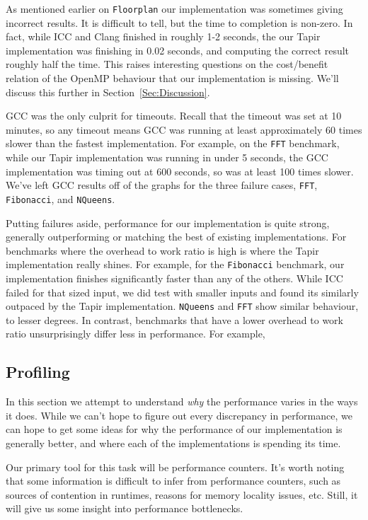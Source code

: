 \documentclass[sigconf]{acmart}
\begin{document}
As mentioned earlier on \texttt{Floorplan} our implementation was sometimes
giving incorrect results. It is difficult to tell, but the time to completion
is non-zero. In fact, while ICC and Clang finished in roughly 1-2 seconds, the
our Tapir implementation was finishing in 0.02 seconds, and computing the
correct result roughly half the time. This raises interesting questions on the
cost/benefit relation of the OpenMP behaviour that our implementation is
missing. We'll discuss this further in Section~\ref{Sec:Discussion}.

GCC was the only culprit for timeouts. Recall that the timeout was set at 10
minutes, so any timeout means GCC was running at least approximately 60 times
slower than the fastest implementation. For example, on the \texttt{FFT}
benchmark, while our Tapir implementation was running in under 5 seconds, the
GCC implementation was timing out at 600 seconds, so was at least 100 times
slower. We've left GCC results off of the graphs for the three failure cases, 
\texttt{FFT}, \texttt{Fibonacci}, and \texttt{NQueens}.

Putting failures aside, performance for our implementation is quite strong,
generally outperforming or matching the best of existing implementations. For
benchmarks where the overhead to work ratio is high is where the Tapir
implementation really shines. For example, for the \texttt{Fibonacci}
benchmark, our implementation finishes significantly faster than any of the
others. While ICC failed for that sized input, we did test with smaller inputs
and found its similarly outpaced by the Tapir implementation.  \texttt{NQueens}
and \texttt{FFT} show similar behaviour, to lesser degrees. In contrast,
benchmarks that have a lower overhead to work ratio unsurprisingly differ less
in performance. For example,  

\subsection{Profiling}

In this section we attempt to understand \emph{why} the performance varies in
the ways it does. While we can't hope to figure out every discrepancy in
performance, we can hope to get some ideas for why the performance of our
implementation is generally better, and where each of the implementations is
spending its time.

Our primary tool for this task will be performance counters. It's worth noting
that some information is difficult to infer from performance counters, such as
sources of contention in runtimes, reasons for memory locality issues, etc.
Still, it will give us some insight into performance bottlenecks.
\end{document}
